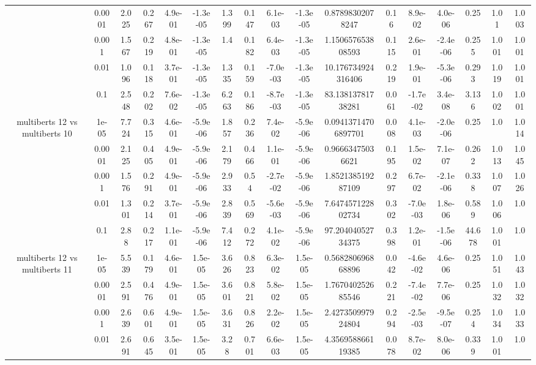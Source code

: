 \begin{tabular}{|c|c|c|c|c|c|c|c|c|c|c|c|c|c|c|c|c|}
 & 0.0001 & 2.025 & 0.267 & 4.9e-01 & -1.3e-05 & 1.399 & 0.147 & 6.1e-03 & -1.3e-05 & 0.87898302078247 & 0.16 & 8.9e-02 & 4.0e-06 & 0.25 & 1.01 & 1.003 \\
 & 0.001 & 1.567 & 0.219 & 4.8e-01 & -1.3e-05 & 1.4 & 0.182 & 6.4e-03 & -1.3e-05 & 1.150657653808593 & 0.115 & 2.6e-01 & -2.4e-06 & 0.255 & 1.001 & 1.001 \\
 & 0.01 & 1.096 & 0.118 & 3.7e-01 & -1.3e-05 & 1.335 & 0.159 & -7.0e-03 & -1.3e-05 & 10.176734924316406 & 0.219 & 1.9e-01 & -5.3e-06 & 0.293 & 1.019 & 1.001 \\
 & 0.1 & 2.548 & 0.202 & 7.6e-02 & -1.3e-05 & 6.263 & 0.186 & -8.7e-03 & -1.3e-05 & 83.13813781738281 & 0.061 & -1.7e-02 & 3.4e-08 & 3.136 & 1.002 & 1.001 \\
\hline
\multirow{5}{*}{multiberts 12 vs multiberts 10} & 1e-05 & 7.724 & 0.315 & 4.6e-01 & -5.9e-06 & 1.857 & 0.236 & 7.4e-02 & -5.9e-06 & 0.09413714706897701 & 0.008 & 4.1e-03 & -2.0e-06 & 0.25 & 1.0 & 1.014 \\
 & 0.0001 & 2.125 & 0.405 & 4.9e-01 & -5.9e-06 & 2.179 & 0.466 & 1.1e-01 & -5.9e-06 & 0.96663475036621 & 0.195 & 1.5e-02 & 7.1e-07 & 0.262 & 1.013 & 1.045 \\
 & 0.001 & 1.576 & 0.291 & 4.9e-01 & -5.9e-06 & 2.933 & 0.54 & -2.7e-02 & -5.9e-06 & 1.852138519287109 & 0.297 & 6.7e-02 & -2.1e-06 & 0.338 & 1.007 & 1.026 \\
 & 0.01 & 1.301 & 0.214 & 3.7e-01 & -5.9e-06 & 2.839 & 0.569 & -5.6e-03 & -5.9e-06 & 7.647457122802734 & 0.302 & -7.0e-03 & 1.8e-06 & 0.589 & 1.006 & 1.0 \\
 & 0.1 & 2.88 & 0.217 & 1.1e-01 & -5.9e-06 & 7.412 & 0.272 & 4.1e-02 & -5.9e-06 & 97.20404052734375 & 0.398 & 1.2e-01 & -1.5e-06 & 44.678 & 1.001 & 1.0 \\
\hline
\multirow{5}{*}{multiberts 12 vs multiberts 11} & 1e-05 & 5.539 & 0.179 & 4.6e-01 & 1.5e-05 & 3.626 & 0.823 & 6.3e-02 & 1.5e-05 & 0.568280696868896 & 0.042 & -4.6e-02 & 4.6e-06 & 0.25 & 1.051 & 1.043 \\
 & 0.0001 & 2.591 & 0.476 & 4.9e-01 & 1.5e-05 & 3.601 & 0.821 & 5.8e-02 & 1.5e-05 & 1.767040252685546 & 0.221 & -7.4e-02 & 7.7e-06 & 0.25 & 1.032 & 1.032 \\
 & 0.001 & 2.639 & 0.601 & 4.9e-01 & 1.5e-05 & 3.631 & 0.826 & 2.2e-02 & 1.5e-05 & 2.427350997924804 & 0.294 & -2.5e-03 & -9.5e-07 & 0.254 & 1.034 & 1.033 \\
 & 0.01 & 2.691 & 0.645 & 3.5e-01 & 1.5e-05 & 3.28 & 0.701 & 6.6e-03 & 1.5e-05 & 4.356958866119385 & 0.078 & 8.7e-02 & 8.0e-06 & 0.339 & 1.001 & 1.0 \\

\end{tabular}
